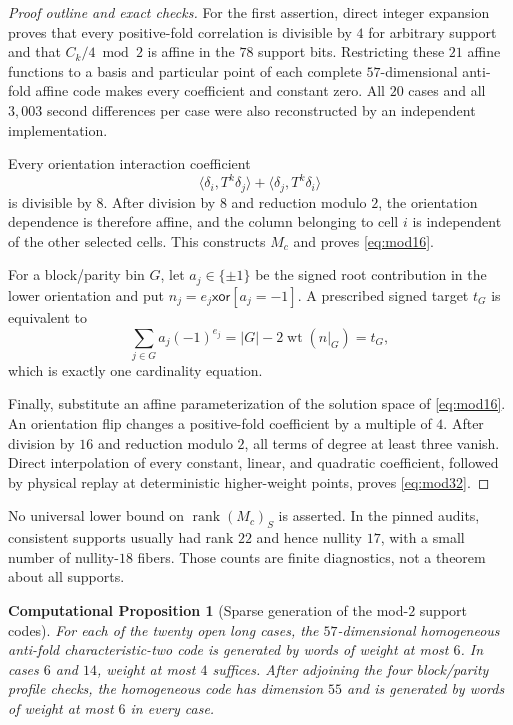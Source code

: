\documentclass[11pt]{article}
\newtheorem{computationalproposition}[theorem]{Computational Proposition}
\theoremstyle{remark}
\newcommand{\wt}{\operatorname{wt}}
\begin{document}
\begin{proof}[Proof outline and exact checks]
For the first assertion, direct integer expansion proves that every
positive-fold correlation is divisible by $4$ for arbitrary support and
that $C_k/4\bmod2$ is affine in the $78$ support bits.  Restricting these
$21$ affine functions to a basis and particular point of each complete
$57$-dimensional anti-fold affine code makes every coefficient and constant
zero.  All $20$ cases and all $3{,}003$ second differences per case were
also reconstructed by an independent implementation.

Every orientation interaction coefficient
\[
 \langle\delta_i,T^k\delta_j\rangle+
 \langle\delta_j,T^k\delta_i\rangle
\]
is divisible by $8$.  After division by $8$ and reduction modulo $2$, the
orientation dependence is therefore affine, and the column belonging to
cell $i$ is independent of the other selected cells.  This constructs
$M_c$ and proves \eqref{eq:mod16}.

For a block/parity bin $G$, let $a_j\in\{\pm1\}$ be the signed root
contribution in the lower orientation and put
$n_j=e_j\mathbin{\mathsf{xor}}[a_j=-1]$.  A prescribed signed target $t_G$
is equivalent to
\[
 \sum_{j\in G}a_j(-1)^{e_j}
 =|G|-2\wt(n|_G)=t_G,
\]
which is exactly one cardinality equation.

Finally, substitute an affine parameterization of the solution space of
\eqref{eq:mod16}.  An orientation flip changes a positive-fold coefficient
by a multiple of $4$.  After division by $16$ and reduction modulo $2$,
all terms of degree at least three vanish.  Direct interpolation of every
constant, linear, and quadratic coefficient, followed by physical replay
at deterministic higher-weight points, proves \eqref{eq:mod32}.
\end{proof}

No universal lower bound on $\operatorname{rank}(M_c)_S$ is asserted.  In
the pinned audits, consistent supports usually had rank $22$ and hence
nullity $17$, with a small number of nullity-$18$ fibers.  Those counts are
finite diagnostics, not a theorem about all supports.

\begin{computationalproposition}[Sparse generation of the mod-$2$ support codes]
\label{prop:sparse-code}
For each of the twenty open long cases, the $57$-dimensional homogeneous
anti-fold characteristic-two code is generated by words of weight at most
$6$.  In cases $6$ and $14$, weight at most $4$ suffices.  After adjoining
the four block/parity profile checks, the homogeneous code has dimension
$55$ and is generated by words of weight at most $6$ in every case.
\end{computationalproposition}
\end{document}
